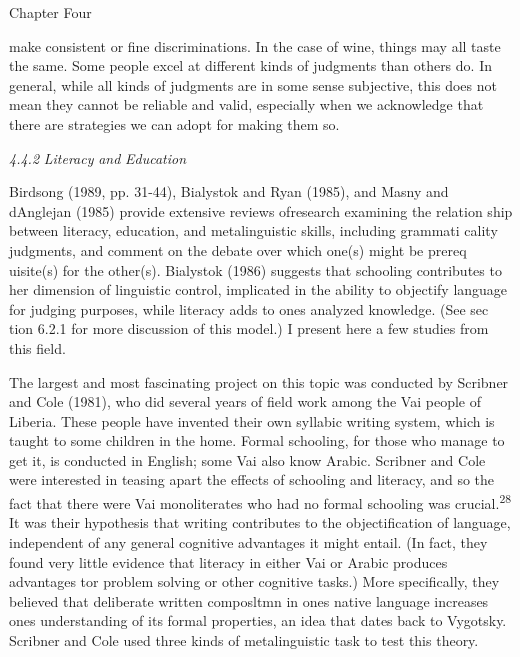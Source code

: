 \clearpage\setcounter{page}{1}\begin{styleStandard}
Chapter Four
\end{styleStandard}


\begin{styleTextbody}
make consistent or fine discriminations. In the case of wine, things may all taste the same. Some people excel at different kinds of judgments than others do. In general, while all kinds of judgments are in some sense subjective, this does not mean they cannot be reliable and valid, especially when we acknowledge that there are strategies we can adopt for making them so.
\end{styleTextbody}


\begin{styleStandard}
\textit{4.4.}\textit{2}\textit{ }\textit{Literacy}\textit{ }\textit{and}\textit{ }\textit{Education}
\end{styleStandard}


\begin{styleTextbody}
Birdsong (1989, pp. 31-44), Bialystok and Ryan (1985), and Masny and d{\textquotesingle}Anglejan (1985) provide extensive reviews ofresearch examining the relation\- ship between literacy, education, and metalinguistic skills, including grammati\- cality judgments, and comment on the debate over which one(s) might be prereq\- uisite(s) for the other(s). Bialystok (1986) suggests that schooling contributes to her dimension of linguistic control, implicated in the ability to objectify language for judging purposes, while literacy adds to one{\textquotesingle}s analyzed knowledge. (See sec\- tion 6.2.1 for more discussion of this model.) I present here a few studies from this field.
\end{styleTextbody}


\begin{styleTextbody}
The largest and most fascinating project on this topic was conducted by Scribner and Cole (1981), who did several years of field work among the Vai people of Liberia. These people have invented their own syllabic writing system, which is taught to some children in the home. Formal schooling, for those who manage to get it, is conducted in English; some Vai also know Arabic. Scribner and Cole were interested in teasing apart the effects of schooling and literacy, and so the fact that there were Vai monoliterates who had no formal schooling was crucial.\textsuperscript{28}\textsuperscript{ }It was their hypothesis that writing contributes to the objectification of language, independent of any general cognitive advantages it might entail. (In fact, they found very little evidence that literacy in either Vai or Arabic produces advantages tor problem solving or other cognitive tasks.) More specifically, they believed that deliberate written composltmn in one{\textquotesingle}s native language increases one{\textquotesingle}s understanding of its formal properties, an idea that dates back to Vygotsky. Scribner and Cole used three kinds of metalinguistic task to test this theory.
\end{styleTextbody}


